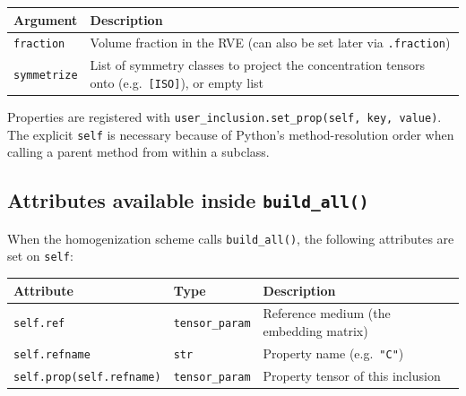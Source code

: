 \documentclass[
  a4paper,
  numbers=noendperiod,
  DIV=12]{scrreprt}
\newcounter{none} %
\begin{document}
{\def\LTcaptype{none} %
\begin{longtable}[]{@{}
  >{\raggedright\arraybackslash}p{}
  >{\raggedright\arraybackslash}p{}@{}}
\toprule\noalign{}
\begin{minipage}[b]{\linewidth}\raggedright
Argument
\end{minipage} & \begin{minipage}[b]{\linewidth}\raggedright
Description
\end{minipage} \\
\midrule\noalign{}
\endhead
\bottomrule\noalign{}
\endlastfoot
\texttt{fraction} & Volume fraction in the RVE (can also be set later
via \texttt{.fraction}) \\
\texttt{symmetrize} & List of symmetry classes to project the
concentration tensors onto (e.g.~\texttt{{[}ISO{]}}), or empty list \\
\end{longtable}
}

Properties are registered with
\texttt{user\_inclusion.set\_prop(self,\ key,\ value)}. The explicit
\texttt{self} is necessary because of Python's method-resolution order
when calling a parent method from within a subclass.

\subsection{\texorpdfstring{Attributes available inside
\texttt{build\_all()}}{Attributes available inside build\_all()}}\label{attributes-available-inside-build_all}

When the homogenization scheme calls \texttt{build\_all()}, the
following attributes are set on \texttt{self}:

{\def\LTcaptype{none} %
\begin{longtable}[]{@{}
  >{\raggedright\arraybackslash}p{}
  >{\raggedright\arraybackslash}p{}
  >{\raggedright\arraybackslash}p{}@{}}
\toprule\noalign{}
\begin{minipage}[b]{\linewidth}\raggedright
Attribute
\end{minipage} & \begin{minipage}[b]{\linewidth}\raggedright
Type
\end{minipage} & \begin{minipage}[b]{\linewidth}\raggedright
Description
\end{minipage} \\
\midrule\noalign{}
\endhead
\bottomrule\noalign{}
\endlastfoot
\texttt{self.ref} & \texttt{tensor\_param} & Reference medium (the
embedding matrix) \\
\texttt{self.refname} & \texttt{str} & Property name
(e.g.~\texttt{"C"}) \\
\texttt{self.prop(self.refname)} & \texttt{tensor\_param} & Property
tensor of this inclusion \\
\end{longtable}
}
\end{document}
